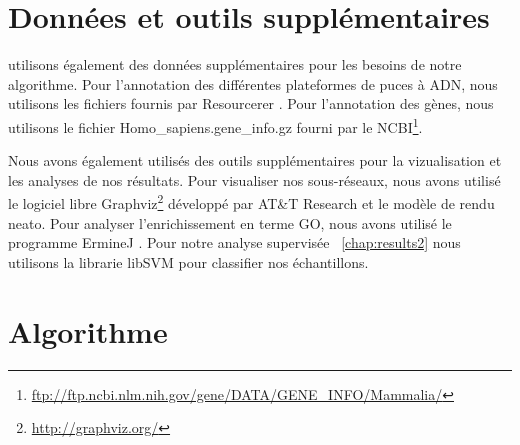 	\section{\textcolor{mygreen}{Données et outils supplémentaires}}
		 utilisons également des données supplémentaires pour les besoins de notre algorithme.
			Pour l'annotation des différentes plateformes de puces à \acs{ADN}, nous utilisons les fichiers fournis par Resourcerer \citep{Tsai2001}.
			Pour l'annotation des gènes, nous utilisons le fichier Homo\_sapiens.gene\_info.gz fourni par le \acs{NCBI}\footnote{\url{ftp://ftp.ncbi.nlm.nih.gov/gene/DATA/GENE_INFO/Mammalia/}}.

			Nous avons également utilisés des outils supplémentaires pour la vizualisation et les analyses de nos résultats.
			Pour visualiser nos sous-réseaux, nous avons utilisé le logiciel libre Graphviz\footnote{\url{http://graphviz.org/}} développé par AT\&T Research et le modèle de rendu neato.
			Pour analyser l'enrichissement en terme GO, nous avons utilisé le programme ErmineJ \citep{Gillis2010}.
			Pour notre analyse supervisée ~\ref{chap:results2} nous utilisons la librarie libSVM \citep{Chang2007} pour classifier nos échantillons.

	\pagebreak

	\section{\textcolor{mygreen}{Algorithme}}

